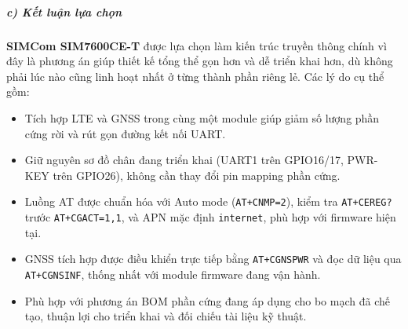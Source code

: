 \documentclass[a4paper]{extarticle}
\providecommand{\tightlist}{%
  \setlength{\itemsep}{0pt}\setlength{\parskip}{0pt}}
\begin{document}
\subparagraph{c) Kết luận lựa
chọn}\label{c-kux1ebft-luux1eadn-lux1ef1a-chux1ecdn}

\textbf{SIMCom SIM7600CE-T} được lựa chọn làm kiến trúc truyền thông
chính vì đây là phương án giúp thiết kế tổng thể gọn hơn và dễ triển
khai hơn, dù không phải lúc nào cũng linh hoạt nhất ở từng thành phần
riêng lẻ. Các lý do cụ thể gồm:

\begin{itemize}
\tightlist
\item
  Tích hợp LTE và GNSS trong cùng một module giúp giảm số lượng phần
  cứng rời và rút gọn đường kết nối UART.
\item
  Giữ nguyên sơ đồ chân đang triển khai (UART1 trên GPIO16/17, PWR-KEY
  trên GPIO26), không cần thay đổi pin mapping phần cứng.
\item
  Luồng AT được chuẩn hóa với Auto mode (\texttt{AT+CNMP=2}), kiểm tra
  \texttt{AT+CEREG?} trước \texttt{AT+CGACT=1,1}, và APN mặc định
  \texttt{internet}, phù hợp với firmware hiện tại.
\item
  GNSS tích hợp được điều khiển trực tiếp bằng \texttt{AT+CGNSPWR} và
  đọc dữ liệu qua \texttt{AT+CGNSINF}, thống nhất với module firmware
  đang vận hành.
\item
  Phù hợp với phương án BOM phần cứng đang áp dụng cho bo mạch đã chế
  tạo, thuận lợi cho triển khai và đối chiếu tài liệu kỹ thuật.
\end{itemize}
\end{document}
